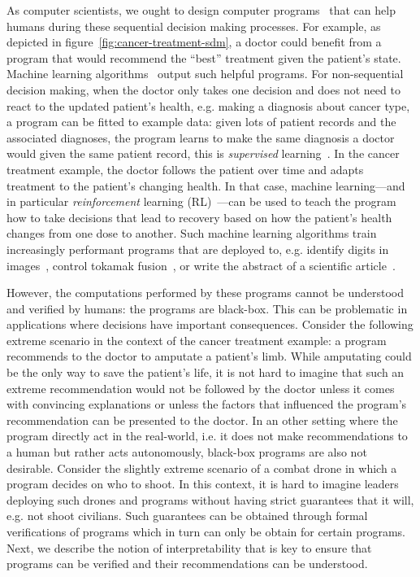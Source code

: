 As computer scientists, we ought to design computer programs~\cite{knuth63} that can help humans during these sequential decision making processes. 
For example, as depicted in figure~\ref{fig:cancer-treatment-sdm}, a doctor could benefit from a program that would recommend the ``best'' treatment given the patient's state. 
Machine learning algorithms~\cite{turing} output such helpful programs.
For non-sequential decision making, when the doctor only takes one decision and does not need to react to the updated patient's health, e.g. making a diagnosis about cancer type, a program can be fitted to example data: given lots of patient records and the associated diagnoses, the program learns to make the same diagnosis a doctor would given the same patient record, this is \textit{supervised} learning~\cite{sl}. 
In the cancer treatment example, the doctor follows the patient over time and adapts treatment to the patient's changing health. In that case, machine learning—and in particular \textit{reinforcement} learning (RL)~\cite{sutton}—can be used to teach the program how to take decisions that lead to recovery based on how the patient's health changes from one dose to another.  
Such machine learning algorithms train increasingly performant programs that are deployed to, e.g. identify digits in images~\cite{lenet}, control tokamak fusion~\cite{tokamak}, or write the abstract of a scientific article~\cite{reinforce-llm}.

However, the computations performed by these programs cannot be understood and verified by humans: the programs are black-box.
This can be problematic in applications where decisions have important consequences. 
Consider the following extreme scenario in the context of the cancer treatment example: a program recommends to the doctor to amputate a patient's limb.
While amputating could be the only way to save the patient's life, it is not hard to imagine that such an extreme recommendation would not be followed by the doctor unless it comes with convincing explanations or unless the factors that influenced the program's recommendation can be presented to the doctor. 
In an other setting where the program directly act in the real-world, i.e. it does not make recommendations to a human but rather acts autonomously, black-box programs are also not desirable.
Consider the slightly extreme scenario of a combat drone in which a program decides on who to shoot.
In this context, it is hard to imagine leaders deploying such drones and programs without having strict guarantees that it will, e.g. not shoot civilians.
Such guarantees can be obtained through formal verifications of programs which in turn can only be obtain for certain programs.
Next, we describe the notion of interpretability that is key to ensure that programs can be verified and their recommendations can be understood.

